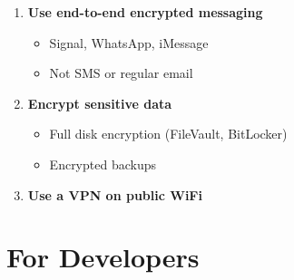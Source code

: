 \documentclass[11pt,a4paper]{report}
\begin{document}
\begin{enumerate}
\item \textbf{Use end-to-end encrypted messaging}
   \begin{itemize}
   \item Signal, WhatsApp, iMessage
   \item Not SMS or regular email
   \end{itemize}

\item \textbf{Encrypt sensitive data}
   \begin{itemize}
   \item Full disk encryption (FileVault, BitLocker)
   \item Encrypted backups
   \end{itemize}

\item \textbf{Use a VPN on public WiFi}
\end{enumerate}

\section{For Developers}
\end{document}
